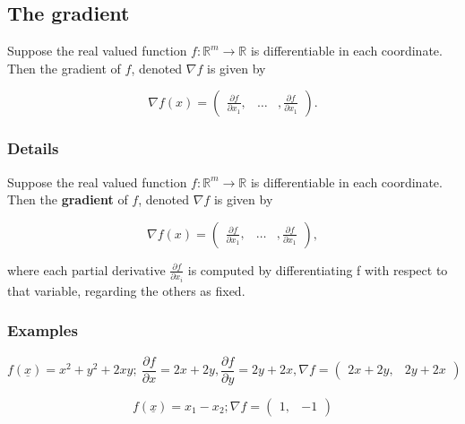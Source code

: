 \documentclass[12pt,a4paper]{article}
\theoremstyle{regla}
\theoremstyle{remark}
\theoremstyle{definition}
\theoremstyle{nonumberbreak}
\begin{document}
\subsection{The gradient}
\begin{fbox}
\begin{minipage}{0.97\textwidth}
Suppose the real valued function $f:\mathbb{R}^m \rightarrow \mathbb{R}$
is differentiable in each coordinate. Then the gradient of $f$, 
denoted $\nabla f$ is given by 


$$\nabla f(x)=\begin{pmatrix}\frac{\partial f}{\partial x_1},&\dots &,\frac{\partial f}{\partial x_1}\end{pmatrix}.$$

\end{minipage}
\end{fbox}
\subsubsection{Details}
\begin{defn}
Suppose the real valued function $f:\mathbb{R}^m \rightarrow \mathbb{R}$ is differentiable in 
each coordinate. Then the {\bf gradient} of $f$, denoted $\nabla f$ is given by 

$$\nabla f(x)=
\begin{pmatrix} \frac{\partial f}{\partial x_1},&\dots &,\frac{\partial f}{\partial x_1}\end{pmatrix},$$

where each partial derivative $\frac{\partial f}{\partial x_i}$ is computed by differentiating f with respect to that variable, regarding the others as fixed. 
\end{defn}
\subsubsection{Examples}
\begin{xmpl}

$$f(\underline{x})= x^2+y^2+2xy;\ \frac{\partial f}{\partial x}=2x+2y,  \frac{\partial f}{\partial y}=2y+2x, \nabla f =\begin{pmatrix}2x+2y, & 2y+2x\end{pmatrix}$$
\end{xmpl}
\begin{xmpl}


$$f(\underline{x})=x_1-x_2; \nabla f= \begin{pmatrix}1, & -1\end{pmatrix}$$
\end{xmpl}
\end{document}

